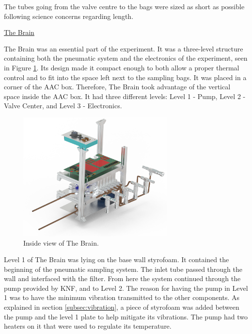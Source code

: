 The tubes going from the valve centre to the bags were sized as short as possible following science concerns regarding length.  


\pagebreak
\underline{The Brain}
\label{subsec:brain}

\smallskip
The Brain was an essential part of the experiment. It was a three-level structure containing both the pneumatic system and the electronics of the experiment, seen in Figure \ref{brain_isometric_open}. Its design made it compact enough to both allow a proper thermal control and to fit into the space left next to the sampling bags. It was placed in a corner of the AAC box. Therefore, The Brain took advantage of the vertical space inside the AAC box. It had three different levels: Level 1 - Pump, Level 2 - Valve Center, and Level 3 - Electronics.


\begin{figure}[H]
    \centering
    \includegraphics[width=0.7\textwidth]{4-experiment-design/img/Mechanical/Figure_23.png}
    \caption{Inside view of The Brain.}
    \label{brain_isometric_open}
\end{figure}

Level 1 of The Brain was lying on the base wall styrofoam. It contained the beginning of the pneumatic sampling system. The inlet tube passed through the wall and interfaced with the filter. From here the system continued through the pump provided by KNF, and to Level 2. The reason for having the pump in Level 1 was to have the minimum vibration transmitted to the other components. As explained in section \ref{subsec:vibration}, a piece of styrofoam was added between the pump and the level 1 plate to help mitigate its vibrations. The pump had two heaters on it that were used to regulate its temperature. %

